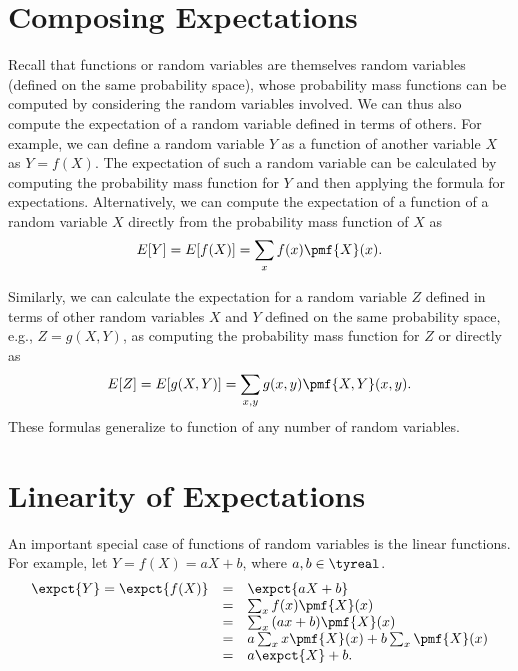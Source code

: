 \section{Composing Expectations}
\label{sec:probability::expectation::compose}
\begin{gram}
Recall that functions or random variables are themselves random
variables (defined on the same probability space), whose probability
mass functions can be computed by considering the random variables
involved.
%
We can thus also compute the expectation of a random variable defined
in terms of others.
%
For example, we can define a random variable $Y$ as a function of
another variable $X$ as $Y = f(X)$.
%
The expectation of such a random variable can be calculated by
computing the probability mass function for $Y$ and then applying the
formula for expectations.
%
Alternatively, we can compute the expectation of a function of a
random variable $X$ directly from the probability mass function of $X$
as
\[
E[Y] = E[f(X)] = \sum_{x}{f(x) \pmf{X}(x)}.
\] 
\end{gram}

\begin{gram}
Similarly, we can calculate the expectation for a random variable $Z$
defined in terms of other random variables $X$ and $Y$ defined on the
same probability space, e.g., $Z = g(X,Y)$, as computing the
probability mass function for $Z$ or directly as
\[
E[Z] = E[g(X,Y)] = \sum_{x,y}{g(x,y) \pmf{X,Y}(x,y)}.
\] 
These formulas generalize to function of any number of random
variables.
\end{gram}

\section{Linearity of Expectations}
\label{sec:probability::expectation::linearity}

\begin{gram}
An important special case of functions of random variables is the
linear functions.  For example, let $Y = f(X) = aX + b$, where $a, b
\in \tyreal$.
%
\[
\begin{array}{lll}
\expct{Y} = \expct{f(X)} 
& = & \expct{aX + b} 
\\
& = & \sum_{x}{f(x) \pmf{X}(x)}
\\
& = & \sum_{x}{(ax + b) \pmf{X}(x)}
\\
& = & a\sum_{x}{x\pmf{X}(x)} + b\sum_{x}{\pmf{X}(x)}
\\
& = & a\expct{X} + b.
\end{array}
\]
\end{gram}

